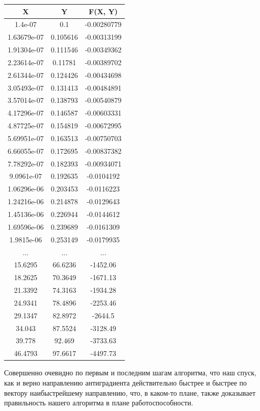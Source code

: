 \documentclass[12pt, a4paper, oneside, final]{article}
\begin{document}
	\begin{table}[H]
		\centering
		\begin{tabular}{|c|c|c|}
			\textbf{X} & \textbf{Y} & \textbf{F(X, Y)} \\ \hline
			1.4e-07&0.1&-0.00280779 \\ \hline
			1.63679e-07&0.105616&-0.00313199 \\ \hline
			1.91304e-07&0.111546&-0.00349362 \\ \hline
			2.23614e-07&0.11781&-0.00389702 \\ \hline
			2.61344e-07&0.124426&-0.00434698 \\ \hline
			3.05493e-07&0.131413&-0.00484891 \\ \hline
			3.57014e-07&0.138793&-0.00540879 \\ \hline
			4.17296e-07&0.146587&-0.00603331 \\ \hline
			4.87725e-07&0.154819&-0.00672995 \\ \hline
			5.69951e-07&0.163513&-0.00750703 \\ \hline
			6.66055e-07&0.172695&-0.00837382 \\ \hline
			7.78292e-07&0.182393&-0.00934071 \\ \hline
			9.0961e-07&0.192635&-0.0104192 \\ \hline
			1.06296e-06&0.203453&-0.0116223 \\ \hline
			1.24216e-06&0.214878&-0.0129643 \\ \hline
			1.45136e-06&0.226944&-0.0144612 \\ \hline
			1.69596e-06&0.239689&-0.0161309 \\ \hline
			1.9815e-06&0.253149&-0.0179935 \\ \hline
			...& ...& ... \\ \hline
			15.6295&66.6236&-1452.06 \\ \hline
			18.2625&70.3649&-1671.13 \\ \hline
			21.3392&74.3163&-1934.28 \\ \hline
			24.9341&78.4896&-2253.46 \\ \hline
			29.1347&82.8972&-2644.5 \\ \hline
			34.043&87.5524&-3128.49 \\ \hline
			39.778&92.469&-3733.63 \\ \hline
			46.4793&97.6617&-4497.73
		\end{tabular}
	\end{table}
	Совершенно очевидно по первым и последним шагам алгоритма, что наш спуск, как и верно направлению антиградиента действительно быстрее и быстрее по вектору наибыстрейшему направлению, что, в каком-то плане, также доказывает правильность нашего алгоритма в плане работоспособности.
\end{document}
